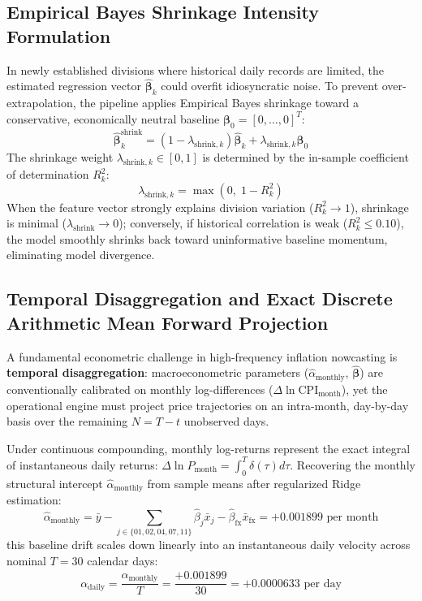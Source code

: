 \subsection{Empirical Bayes Shrinkage Intensity Formulation}
\hs In newly established divisions where historical daily records are limited, the estimated regression vector $\hat{\boldsymbol{\beta}}_k$ could overfit idiosyncratic noise. To prevent over-extrapolation, the pipeline applies Empirical Bayes shrinkage toward a conservative, economically neutral baseline $\boldsymbol{\beta}_0 = [0, \dots, 0]^T$:
\begin{equation}
    \hat{\boldsymbol{\beta}}_k^{\text{shrink}} = (1 - \lambda_{\text{shrink}, k}) \hat{\boldsymbol{\beta}}_k + \lambda_{\text{shrink}, k} \boldsymbol{\beta}_0
\end{equation}
The shrinkage weight $\lambda_{\text{shrink}, k} \in [0, 1]$ is determined by the in-sample coefficient of determination $R_k^2$:
\begin{equation}
    \lambda_{\text{shrink}, k} = \max\left(0, \; 1 - R_k^2\right)
\end{equation}
When the feature vector strongly explains division variation ($R_k^2 \to 1$), shrinkage is minimal ($\lambda_{\text{shrink}} \to 0$); conversely, if historical correlation is weak ($R_k^2 \le 0.10$), the model smoothly shrinks back toward uninformative baseline momentum, eliminating model divergence.

\subsection{Temporal Disaggregation and Exact Discrete Arithmetic Mean Forward Projection}
\hs A fundamental econometric challenge in high-frequency inflation nowcasting is \textbf{temporal disaggregation}: macroeconometric parameters ($\hat{\alpha}_{\text{monthly}}$, $\hat{\boldsymbol{\beta}}$) are conventionally calibrated on monthly log-differences ($\Delta \ln \text{CPI}_{\text{month}}$), yet the operational engine must project price trajectories on an intra-month, day-by-day basis over the remaining $N = T - t$ unobserved days.

\hs Under continuous compounding, monthly log-returns represent the exact integral of instantaneous daily returns: $\Delta \ln P_{\text{month}} = \int_0^T \delta(\tau) d\tau$. Recovering the monthly structural intercept $\hat{\alpha}_{\text{monthly}}$ from sample means after regularized Ridge estimation:
\begin{equation}
    \hat{\alpha}_{\text{monthly}} = \bar{y} - \sum_{j \in \{01, 02, 04, 07, 11\}} \hat{\beta}_j \bar{x}_j - \hat{\beta}_{\text{fx}} \bar{x}_{\text{fx}} = +0.001899 \text{ per month}
\end{equation}
this baseline drift scales down linearly into an instantaneous daily velocity across nominal $T = 30$ calendar days:
\begin{equation}
    \alpha_{\text{daily}} = \frac{\hat{\alpha}_{\text{monthly}}}{T} = \frac{+0.001899}{30} = +0.0000633 \text{ per day}
\end{equation}

